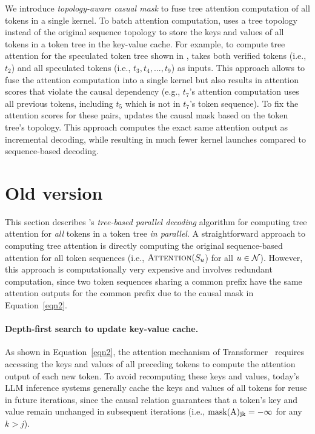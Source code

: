We introduce {\em topology-aware casual mask} to fuse tree attention computation of all tokens in a single kernel. 
To batch attention computation, \Sys uses a tree topology instead of the original sequence topology to store the keys and values of all tokens in a token tree in the key-value cache.
For example, to compute tree attention for the speculated token tree shown in , \Sys takes both verified tokens (i.e., $t_2$) and all speculated tokens (i.e., $t_3,t_4,...,t_9$) as inputs.
This approach allows \Sys to fuse the attention computation into a single kernel but also results in attention scores that violate the causal dependency (e.g., $t_7$'s attention computation uses all previous tokens, including $t_5$ which is not in $t_7$'s token sequence).
To fix the attention scores for these pairs, \Sys updates the causal mask based on the token tree's topology.
This approach computes the exact same attention output as incremental decoding, while resulting in much fewer kernel launches compared to sequence-based decoding.


\section*{Old version}
This section describes \sys's {\em tree-based parallel decoding} algorithm for computing tree attention for {\em all} tokens in a token tree {\em in parallel}.
A straightforward approach to computing tree attention is directly computing the original sequence-based attention for all token sequences (i.e., $\textproc{Attention}(S_u$) for all $u\in\mathcal{N}$).
However, this approach is computationally very expensive and involves redundant computation, since two token sequences sharing a common prefix have the same attention outputs for the common prefix due to the causal mask in Equation~\ref{eqn2}.

\paragraph{Depth-first search to update key-value cache.} As shown in Equation~\ref{eqn2}, the attention mechanism of Transformer~\cite{vaswani2017attention} requires accessing the keys and values of all preceding tokens to compute the attention output of each new token.
To avoid recomputing these keys and values, today's LLM inference systems generally cache the keys and values of all tokens for reuse in future iterations, since the causal relation guarantees that a token's key and value remain unchanged in subsequent iterations (i.e., $\rm{mask(A)_{jk}} = -\infty$ for any $k > j$).

